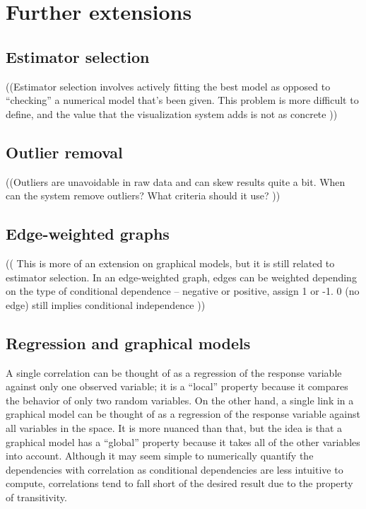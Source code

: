 \section{Further extensions}

\subsection{Estimator selection}

((Estimator selection involves actively fitting the best model as opposed to ``checking'' a numerical model that’s been given. This problem is more difficult to define, and the value that the visualization system adds is not as concrete ))

\subsection{Outlier removal}

((Outliers are unavoidable in raw data and can skew results quite a bit. When can the system remove outliers? What criteria should it use? ))

\subsection{Edge-weighted graphs}

(( This is more of an extension on graphical models, but it is still related to estimator selection. In an edge-weighted graph, edges can be weighted depending on the type of conditional dependence – negative or positive, assign 1 or -1. 0 (no edge) still implies conditional independence ))

\subsection{Regression and graphical models}

A single correlation can be thought of as a regression of the response variable against only one observed variable; it is a ``local'' property because it compares the behavior of only two random variables. On the other hand, a single link in a graphical model can be thought of as a regression of the response variable against all variables in the space. It is more nuanced than that, but the idea is that a graphical model has a “global” property because it takes all of the other variables into account. Although it may seem simple to numerically quantify the dependencies with correlation as conditional dependencies are less intuitive to compute, correlations tend to fall short of the desired result due to the property of transitivity.

